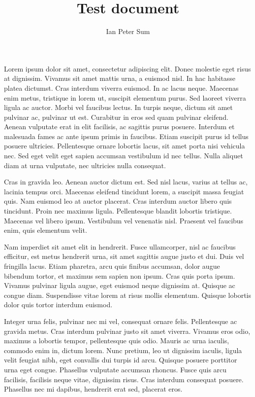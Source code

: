 \documentclass{article}
\begin{document}
\title{Test document}
\author{Ian Peter Sum}
\maketitle

Lorem ipsum dolor sit amet, consectetur adipiscing elit. Donec molestie eget risus at dignissim. Vivamus sit amet mattis urna, a euismod nisl. In hac habitasse platea dictumst. Cras interdum viverra euismod. In ac lacus neque. Maecenas enim metus, tristique in lorem ut, suscipit elementum purus. Sed laoreet viverra ligula ac auctor. Morbi vel faucibus lectus. In turpis neque, dictum sit amet pulvinar ac, pulvinar ut est. Curabitur in eros sed quam pulvinar eleifend. Aenean vulputate erat in elit facilisis, ac sagittis purus posuere. Interdum et malesuada fames ac ante ipsum primis in faucibus. Etiam suscipit purus id tellus posuere ultricies. Pellentesque ornare lobortis lacus, sit amet porta nisi vehicula nec. Sed eget velit eget sapien accumsan vestibulum id nec tellus. Nulla aliquet diam at urna vulputate, nec ultricies nulla consequat.

Cras in gravida leo. Aenean auctor dictum est. Sed nisl lacus, varius at tellus ac, lacinia tempus orci. Maecenas eleifend tincidunt lorem, a suscipit massa feugiat quis. Nam euismod leo at auctor placerat. Cras interdum auctor libero quis tincidunt. Proin nec maximus ligula. Pellentesque blandit lobortis tristique. Maecenas vel libero ipsum. Vestibulum vel venenatis nisl. Praesent vel faucibus enim, quis elementum velit.

Nam imperdiet sit amet elit in hendrerit. Fusce ullamcorper, nisl ac faucibus efficitur, est metus hendrerit urna, sit amet sagittis augue justo et dui. Duis vel fringilla lacus. Etiam pharetra, arcu quis finibus accumsan, dolor augue bibendum tortor, et maximus sem sapien non ipsum. Cras quis porta ipsum. Vivamus pulvinar ligula augue, eget euismod neque dignissim at. Quisque ac congue diam. Suspendisse vitae lorem at risus mollis elementum. Quisque lobortis dolor quis tortor interdum euismod.

Integer urna felis, pulvinar nec mi vel, consequat ornare felis. Pellentesque ac gravida metus. Cras interdum pulvinar justo sit amet viverra. Vivamus eros odio, maximus a lobortis tempor, pellentesque quis odio. Mauris ac urna iaculis, commodo enim in, dictum lorem. Nunc pretium, leo ut dignissim iaculis, ligula velit feugiat nibh, eget convallis dui turpis id arcu. Quisque posuere porttitor urna eget congue. Phasellus vulputate accumsan rhoncus. Fusce quis arcu facilisis, facilisis neque vitae, dignissim risus. Cras interdum consequat posuere. Phasellus nec mi dapibus, hendrerit erat sed, placerat eros.
\end{document}

